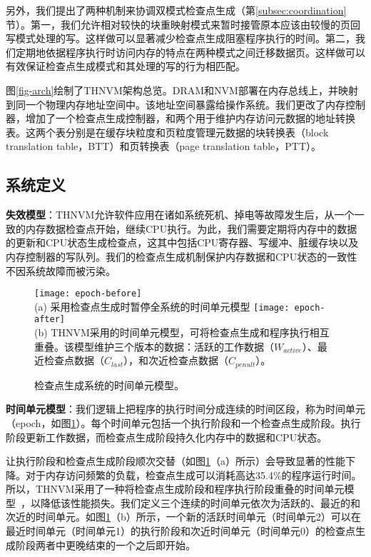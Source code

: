另外，我们提出了两种机制来协调双模式检查点生成（第\ref{subsec:coordination}节）。第一，我们允许相对较快的块重映射模式来暂时接管原本应该由较慢的页回写模式处理的写。这样做可以显著减少检查点生成阻塞程序执行的时间。第二，我们定期地依据程序执行时访问内存的特点在两种模式之间迁移数据页。这样做可以有效保证检查点生成模式和其处理的写的行为相匹配。

图\ref{fig-arch}绘制了THNVM架构总览。DRAM和NVM部署在内存总线上，并映射到同一个物理内存地址空间中。该地址空间暴露给操作系统。我们更改了内存控制器，增加了一个检查点生成控制器，和两个用于维护内存访问元数据的地址转换表。这两个表分别是在缓存块粒度和页粒度管理元数据的块转换表（block translation table，BTT）和页转换表（page translation table，PTT）。

\subsection{系统定义}

\textbf{失效模型}：THNVM允许软件应用在诸如系统死机、掉电等故障发生后，从一个一致的内存数据检查点开始，继续CPU执行。为此，我们需要定期将内存中的数据的更新和CPU状态生成检查点，这其中包括CPU寄存器、写缓冲、脏缓存块以及内存控制器的写队列。我们的检查点生成机制保护内存数据和CPU状态的一致性不因系统故障而被污染。

\begin{figure}[!ht]
\centering
\texttt{[image: epoch-before]}\\
{\small (a) 采用检查点生成时暂停全系统的时间单元模型}
\texttt{[image: epoch-after]}\\
{\small (b) THNVM采用的时间单元模型，可将检查点生成和程序执行相互重叠。该模型维护三个版本的数据：活跃的工作数据（$W_{active}$）、最近检查点数据（$C_{last}$），和次近检查点数据（$C_{penult}$）。\hfill}
\caption{检查点生成系统的时间单元模型。}
\label{fig-epoch}
\end{figure}

\textbf{时间单元模型}：我们逻辑上把程序的执行时间分成连续的时间区段，称为时间单元（epoch，如图\ref{fig-epoch}）。每个时间单元包括一个执行阶段和一个检查点生成阶段。执行阶段更新工作数据，而检查点生成阶段持久化内存中的数据和CPU状态。

让执行阶段和检查点生成阶段顺次交替（如图\ref{fig-epoch}（a）所示）会导致显著的性能下降。对于内存访问频繁的负载，检查点生成可以消耗高达35.4\%的程序运行时间。所以，THNVM采用了一种将检查点生成阶段和程序执行阶段重叠的时间单元模型~\cite{1003568}，以降低该性能损失。我们定义三个连续的时间单元依次为活跃的、最近的和次近的时间单元。如图\ref{fig-epoch}（b）所示，一个新的活跃时间单元（时间单元2）可以在最近时间单元（时间单元1）的执行阶段和次近时间单元（时间单元0）的检查点生成阶段两者中更晚结束的一个之后即开始。

